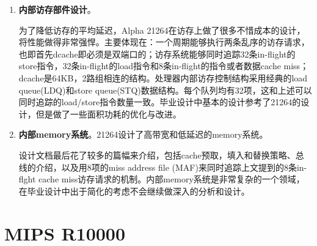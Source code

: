 \begin{enumerate}[label=(\alph*)]
	\item \textbf{内部访存部件设计}。
	
	为了降低访存的平均延迟，Alpha 21264在访存上做了很多不惜成本的设计，将性能做得非常强悍。主要体现在：一个周期能够执行两条乱序的访存请求，也即首先dcache即必须是双端口的；访存系统能够同时追踪32条in-flight的store指令，32条in-flight的load指令和8条in-flight的指令或者数据cache miss；dcache是64KB，2路组相连的结构\citep{Alpha21264}。处理器内部访存控制结构采用经典的load queue(LDQ)和store queue(STQ)数据结构。每个队列均有32项，这和上述可以同时追踪的load/store指令数量一致\citep{Alpha21264}。毕业设计中基本的设计参考了21264的设计，但是做了一些面积功耗的优化与改进。
	\item \textbf{内部memory系统}。21264设计了高带宽和低延迟的memory系统。
	
	设计文档\citet{Alpha21264}最后花了较多的篇幅来介绍，包括cache预取，填入和替换策略、总线的介绍，以及用8项的miss address file (MAF)来同时追踪上文提到的8条in-flght cache miss访存请求的机制。内部memory系统是非常复杂的一个领域，在毕业设计中出于简化的考虑不会继续做深入的分析和设计。
\end{enumerate}

\section{MIPS R10000}\label{subsec:r10000}

